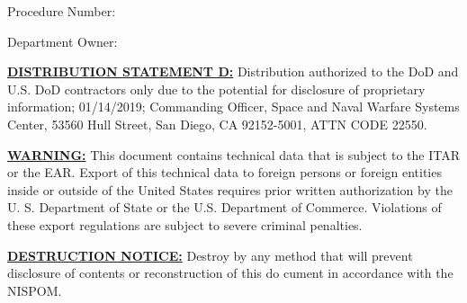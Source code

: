 \begin{titlepage}

    \vspace*{1in}

    \begin{flushright}
        {\Huge\textbf{\titleStr}}

        \vspace*{1ex}

        {\Large Procedure Number:~\procedureNumber}

        \vspace*{1ex}

        {\Large Department Owner:~\departmentOwner}
    \end{flushright}
    \vspace{4in}

    \textbf{\underline{DISTRIBUTION STATEMENT D:}} Distribution authorized to the DoD and U.S. DoD contractors only due to the potential for disclosure of proprietary information; 01/14/2019; Commanding Officer, Space and Naval Warfare Systems Center, 53560 Hull Street, San Diego, CA 92152-5001, ATTN CODE 22550.

    \textbf{\underline{WARNING:}} This document contains technical data that is subject to the \ac{ITAR} or the \ac{EAR}. Export of this technical data to foreign persons or foreign entities inside or outside of the United States requires prior written authorization by the U. S. Department of State or the U.S. Department of Commerce. Violations of these export regulations are subject to severe criminal penalties.

    \textbf{\underline{DESTRUCTION NOTICE:}} Destroy by any method that will prevent disclosure of contents or reconstruction of this do cument in accordance with the \ac{NISPOM}.


\end{titlepage}
